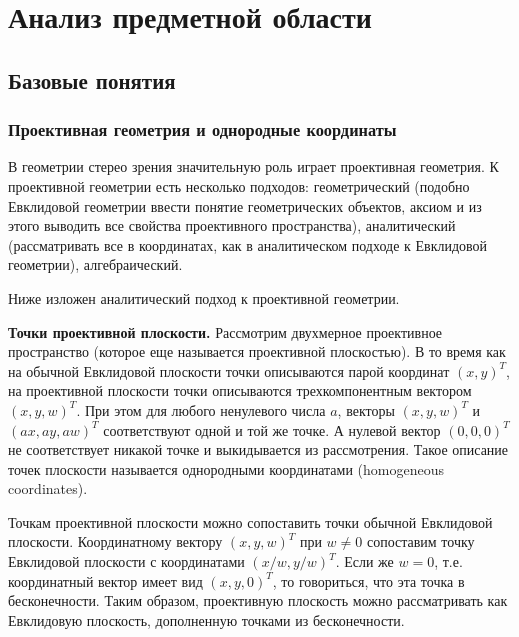 \chapter{Анализ предметной области}
\section{Базовые понятия}


\subsection{Проективная геометрия и однородные координаты}
В геометрии стерео зрения значительную роль играет проективная геометрия. К проективной геометрии есть несколько подходов: геометрический (подобно Евклидовой геометрии ввести понятие геометрических объектов, аксиом и из этого выводить все свойства проективного пространства), аналитический (рассматривать все в координатах, как в аналитическом подходе к Евклидовой геометрии), алгебраический.

Ниже изложен аналитический подход к проективной геометрии.

\textbf{Точки проективной плоскости.} Рассмотрим двухмерное проективное пространство (которое еще называется проективной плоскостью). В то время как на обычной Евклидовой плоскости точки описываются парой координат $(x,y)^T$, на проективной плоскости точки описываются трехкомпонентным вектором $(x,y,w)^T$. При этом для любого ненулевого числа $a$, векторы $(x,y,w)^T$ и $(ax, ay, aw)^T$ соответствуют одной и той же точке. А нулевой вектор $(0,0,0)^T$ не соответствует никакой точке и выкидывается из рассмотрения. Такое описание точек плоскости называется однородными координатами (homogeneous coordinates).

Точкам проективной плоскости можно сопоставить точки обычной Евклидовой плоскости. Координатному вектору $(x,y,w)^T$ при $w \neq 0$ сопоставим точку Евклидовой плоскости с координатами $(x/w, y/w)^T$. Если же $w = 0$, т.е. координатный вектор имеет вид $(x, y, 0)^T$, то говориться, что эта точка в бесконечности. Таким образом, проективную плоскость можно рассматривать как Евклидовую плоскость, дополненную точками из бесконечности.

